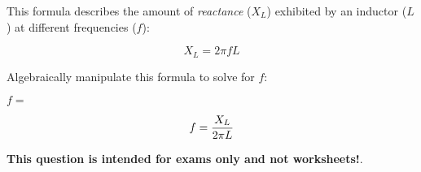 

This formula describes the amount of {\it reactance} ($X_L$) exhibited by an inductor ($L$) at different frequencies ($f$):

$$X_L = 2 \pi f L$$

Algebraically manipulate this formula to solve for $f$:

\vskip 20pt

$f = $







$$f = {X_L \over {2 \pi L}}$$







{\bf This question is intended for exams only and not worksheets!}.



